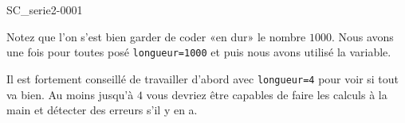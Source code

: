 \begin{corrige}{SC_serie2-0001}



Notez que l'on s'est bien garder de coder «en dur» le nombre $1000$. Nous avons une fois pour toutes posé \verb+longueur=1000+ et puis nous avons utilisé la variable.

Il est fortement conseillé de travailler d'abord avec \verb+longueur=4+ pour voir si tout va bien. Au moins jusqu'à $4$ vous devriez être capables de faire les calculs à la main et détecter des erreurs s'il y en a.

\end{corrige}
